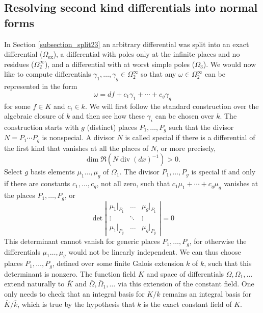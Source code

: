 \documentclass[12pt,reqno]{amsart}
\numberwithin{equation}{section}
\newcommand{\op}[1]  { \operatorname{ #1 }}
\newcommand{\goR}[0]  { \mathfrak{R}}
\begin{document}
\subsection{Resolving second kind differentials into normal forms}
\label{subsection_resolve2}
In Section \ref{subsection_split23} an arbitrary differential was
split into an exact differential ($\Omega_{\op{ex}}$),
a differential with poles only at the infinite places and no
residues ($\Omega_{2}^{\infty}$), and a differential
with at worst simple poles ($\Omega_{3}$).
We would now like to compute differentials $\gamma_1,\dots,\gamma_g \in \Omega_2^{\infty}$ so
that any $\omega \in \Omega_2^{\infty}$ can be represented in the form
\begin{equation}
\label{equ_resolve2form}
 \omega = d f + c_1 \gamma_1 + \cdots + c_g \gamma_g
\end{equation}
for some $f \in K$ and $c_i\in k$. We will first follow the standard construction over the algebraic closure of $k$ \cite{rosen} and then see how these $\gamma_i$ can be chosen over $k$. The construction starts with $g$ (distinct) places $P_1,\dots,P_g$ such that the divisor $N=P_1 \cdots P_g$ is nonspecial. A divisor $N$ is called special if there is a differential of the first kind that vanishes at all the places of $N$, or more precisely,
\begin{equation*}
 \op{dim}\goR(N \op{div}(dx)^{-1}) > 0 \text{.}
\end{equation*}
Select $g$ basis elements $\mu_1\dots,\mu_g$ of $\Omega_1$. The divisor $P_1,\dots,P_g$ is special if and only if there are constants $c_1,\dots,c_g$, not all zero, such that $c_1 \mu_1 + \cdots + c_g \mu_g$ vanishes at the places $P_1,\dots,P_g$, or
\begin{equation*}
 \det \left| \begin{array}{ccc}
        \mu_1|_{P_1} & \dots & \mu_g|_{P_1}\\
	  \vdots & \ddots & \vdots \\
        \mu_1|_{P_g} & \dots & \mu_g|_{P_g}
       \end{array}
\right| = 0
\end{equation*}
This determinant cannot vanish for generic places $P_1,\dots,P_g$, for otherwise the differentials $\mu_1\dots,\mu_g$ would not be linearly independent. We can thus choose places $P_1,\dots,P_g$, defined over some finite Galois extension $\overline{k}$ of $k$, such that this determinant is nonzero. The function field $K$ and space of differentials $\Omega, \Omega_1, \dots$ extend naturally to $\overline{K}$ and $\overline{\Omega}, \overline{\Omega}_1, \dots$ via this extension of the constant field. One only needs to check that an integral basis for $K/k$ remains an integral basis for $\overline{K}/\overline{k}$, which is true by the hypothesis that $k$ is the exact constant field of $K$.
\end{document}
